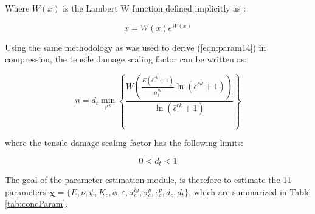 Where $W\left(x\right)$ is the Lambert W function defined implicitly as \cite{Corless_1996}:

\begin{equation}
x=W\left(x\right)e^{W(x)}\label{eqn:param8}
\end{equation}

Using the same methodology as was used to derive (\ref{eqn:param14}) in compression, the tensile damage scaling factor can be written as:

\begin{equation}
n=d_{t}\min_{\bar{\epsilon}^{ck}}\left\{\frac{W\left(\frac{E\left(\bar{\epsilon}^{ck}+1\right)}{\sigma_{t}^{iy}}\ln\left(\bar{\epsilon}^{ck}+1\right)\right)}{\ln\left(\bar{\epsilon}^{ck}+1\right)}\right\}
\label{eqn:param9}
\end{equation}

where the tensile damage scaling factor has the following limits:

\begin{equation}
0<d_{t}<1\label{eqn:param10}
\end{equation}

The goal of the parameter estimation module, is therefore to estimate the 11 parameters $\boldsymbol{\chi}=\{E,\nu,\psi, K_c, \phi, \varepsilon, \sigma_c^{iy},\allowbreak\sigma_{c}^{p}, \epsilon_c^{p}, d_c, d_t \}$, which are summarized in Table \ref{tab:concParam}.

